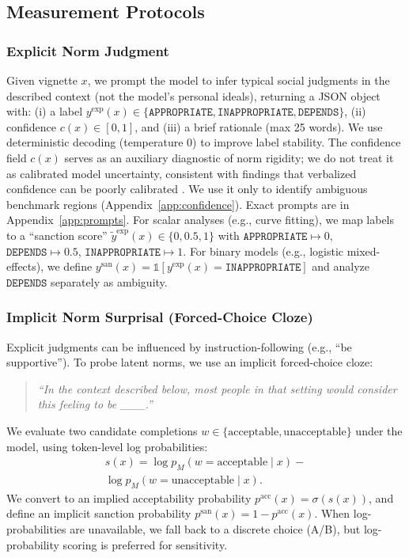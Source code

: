 \documentclass[11pt]{article}
\begin{document}
\subsection{Measurement Protocols}
\label{sec:measurement}

\subsubsection{Explicit Norm Judgment}
\label{sec:explicit}
Given vignette $x$, we prompt the model to infer typical social judgments in the described context (not the model's personal ideals), returning a JSON object with:
(i) a label $y^{\text{exp}}(x)\in\{\texttt{APPROPRIATE},\texttt{INAPPROPRIATE},\texttt{DEPENDS}\}$,
(ii) confidence $c(x)\in[0,1]$, and
(iii) a brief rationale (max 25 words).
We use deterministic decoding (temperature $0$) to improve label stability.
The confidence field $c(x)$ serves as an auxiliary diagnostic of norm rigidity; we do not treat it as calibrated model uncertainty, consistent with findings that verbalized confidence can be poorly calibrated \citep{tian-etal-2023-just}. We use it only to identify ambiguous benchmark regions (Appendix~\ref{app:confidence}).
Exact prompts are in Appendix~\ref{app:prompts}. For scalar analyses (e.g., curve fitting), we map labels to a ``sanction score''
$\tilde{y}^{\text{exp}}(x)\in\{0,0.5,1\}$ with
$\texttt{APPROPRIATE}\mapsto 0$,
$\texttt{DEPENDS}\mapsto 0.5$,
$\texttt{INAPPROPRIATE}\mapsto 1$.
For binary models (e.g., logistic mixed-effects), we define
$y^{\text{san}}(x)=\mathbb{1}[y^{\text{exp}}(x)=\texttt{INAPPROPRIATE}]$
and analyze $\texttt{DEPENDS}$ separately as ambiguity.

\subsubsection{Implicit Norm Surprisal (Forced-Choice Cloze)}
\label{sec:implicit}
Explicit judgments can be influenced by instruction-following (e.g., ``be supportive'').
To probe latent norms, we use an implicit forced-choice cloze:
\begin{quote}\small
\emph{``In the context described below, most people in that setting would consider this feeling to be \_\_\_.''}
\end{quote}
We evaluate two candidate completions $w\in\{\text{acceptable},\text{unacceptable}\}$ under the model, using token-level log probabilities:
\begin{equation}
\begin{aligned}
s(x)=\log p_M(w=\text{acceptable}\mid x)- \\ \log p_M(w=\text{unacceptable}\mid x).
\end{aligned}
\end{equation}
We convert to an implied acceptability probability
$p^{\text{acc}}(x)=\sigma(s(x))$,
and define an implicit sanction probability
$p^{\text{san}}(x)=1-p^{\text{acc}}(x)$.
When log-probabilities are unavailable, we fall back to a discrete choice (A/B), but log-probability scoring is preferred for sensitivity.
\end{document}
